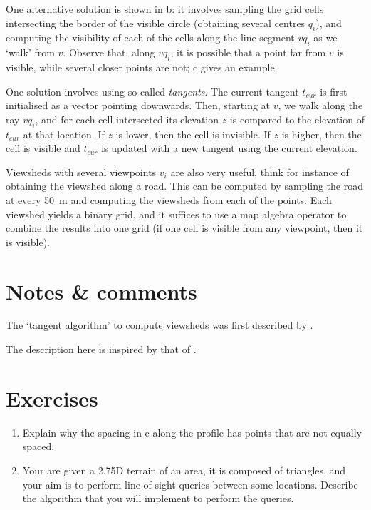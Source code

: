 %

One alternative solution is shown in b: it involves sampling the grid cells intersecting the border of the visible circle (obtaining several centres $q_i$), and computing the visibility of each of the cells along the line segment $vq_i$ as we `walk' from $v$.
Observe that, along $vq_i$, it is possible that a point far from $v$ is visible, while several closer points are not; c gives an example.

One solution involves using so-called \emph{tangents}.
The current tangent $t_{cur}$ is first initialised as a vector pointing downwards.
Then, starting at $v$, we walk along the ray $vq_i$, and for each cell intersected its elevation $z$ is compared to the elevation of $t_{cur}$ at that location.
If $z$ is lower, then the cell is invisible.
If $z$ is higher, then the cell is visible and $t_{cur}$ is updated with a new tangent using the current elevation.

Viewsheds with several viewpoints $v_i$ are also very useful, think for instance of obtaining the viewshed along a road.
This can be computed by sampling the road at every \qty{50}{\m} and computing the viewsheds from each of the points. 
Each viewshed yields a binary grid, and it suffices to use a map algebra operator to combine the results into one grid (if one cell is visible from any viewpoint, then it is visible).


%
\section{Notes \& comments}

The `tangent algorithm' to compute viewsheds was first described by \citet{Blelloch90}.

The description here is inspired by that of \citet{DeFloriani99-1}.


%
\section{Exercises}

\begin{enumerate}
  \item Explain why the spacing in c along the profile has points that are not equally spaced.
  \item Your are given a 2.75D terrain of an area, it is composed of triangles, and your aim is to perform line-of-sight queries between some locations. Describe the algorithm that you will implement to perform the queries.
\end{enumerate}
